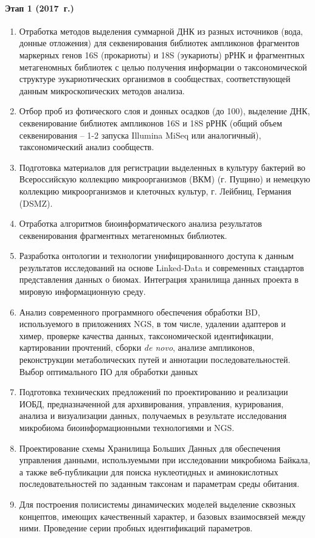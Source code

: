 \documentclass[a4paper,12pt,openany,final]{extreport}
\makeatletter
\newcommand\theyear{2017}
\def\vhrulefill#1{\leavevmode\leaders\hrule\@height#1\hfill \kern\z@}
\newcommand\bottomrule{\noindent\vhrulefill{2pt}}
\makeatother
\begin{document}
\paragraph{Этап 1 (\theyear~г.)}
\begin{enumerate}
\item Отработка методов выделения суммарной ДНК из разных
  источников (вода, донные отложения) для секвенирования библиотек
  ампликонов фрагментов маркерных генов 16S (прокариоты) и 18S
  (эукариоты) рРНК и фрагментных метагеномных библиотек с целью
  получения информации о таксономической структуре эукариотических
  организмов в сообществах, соответствующей данным микроскопических
  методов анализа.

\item  Отбор проб из фотического слоя и донных осадков (до 100), выделение
ДНК, секвенирование библиотек ампликонов 16S и 18S рРНК (общий объем
секвенирования -- 1-2 запуска Illumina MiSeq или аналогичный),
таксономический анализ сообществ.

\item  Подготовка материалов для регистрации выделенных в культуру бактерий
во Всероссийскую коллекцию микроорганизмов (ВКМ) (г. Пущино) и немецкую
коллекцию микроорганизмов и клеточных культур, г. Лейбниц, Германия
(DSMZ).

\item Отработка алгоритмов биоинформатического анализа результатов
секвенирования фрагментных метагеномных библиотек.

\item  Разработка онтологии и технологии унифицированного доступа к данным
результатов исследований на основе Linked-Data и современных стандартов
представления данных о биомах. Интеграция хранилища данных проекта в
мировую информационную среду.

\item  Анализ современного программного обеспечения обработки BD,
используемого в приложениях NGS, в том числе, удалении адаптеров и
химер, проверке качества данных, таксономической идентификации,
картировании прочтений, сборки \textit{de novo}, анализе ампликонов,
реконструкции метаболических путей и аннотации последовательностей.
Выбор оптимального ПО для обработки данных

\item  Подготовка технических предложений по проектированию и реализации
ИОБД, предназначенной для архивирования, управления, курирования,
анализа и визуализации данных, получаемых в результате исследования
микробиома биоинформационными технологиями и NGS.

\item  Проектирование схемы Хранилища Больших Данных для обеспечения
управления данными, используемыми при исследовании микробиома Байкала, а
также веб-публикации для поиска нуклеотидных и аминокислотных
последовательностей по заданным таксонам и параметрам среды обитания.

\item  Для построения полисистемы динамических моделей выделение сквозных
концептов, имеющих качественный характер, и базовых взаимосвязей между
ними. Проведение серии пробных идентификаций параметров.\strut
\end{enumerate}


\end{document}
